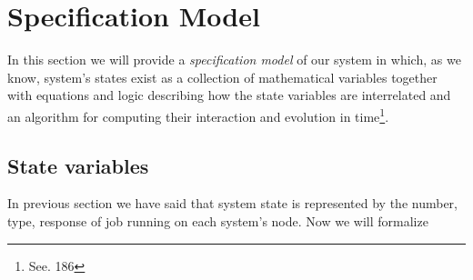 \documentclass[10pt,a4paper]{article}
\begin{document}
\newpage
\section{Specification  Model}

In this section we will provide a \textit{specification model} of our system in which, as we know, system's states exist as a collection of mathematical variables together with equations and logic describing how the state variables are interrelated and an algorithm for computing their interaction and evolution in time\footnote{See. 186}.

\subsection{State variables}

In previous section we have said that system state is represented by the number, type, response of job running on each system's node. Now we will formalize 
\end{document}
